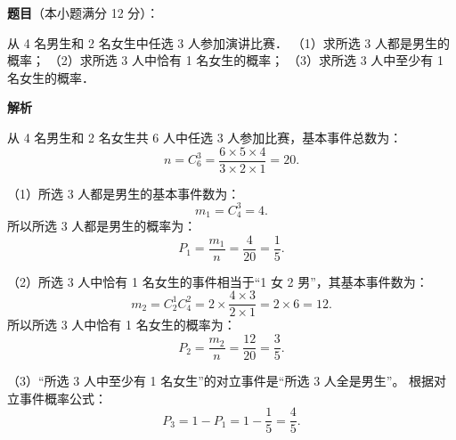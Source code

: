 \begin{answer}

\textbf{题目}（本小题满分 12 分）：

从 4 名男生和 2 名女生中任选 3 人参加演讲比赛．
（1）求所选 3 人都是男生的概率；
（2）求所选 3 人中恰有 1 名女生的概率；
（3）求所选 3 人中至少有 1 名女生的概率．

\textbf{解析}

从 4 名男生和 2 名女生共 6 人中任选 3 人参加比赛，基本事件总数为：
\nopagebreak[4]
\[
n = C_6^3 = \dfrac{6 \times 5 \times 4}{3 \times 2 \times 1} = 20.
\]

（1）所选 3 人都是男生的基本事件数为：
\nopagebreak[4]
\[
m_1 = C_4^3 = 4.
\]
所以所选 3 人都是男生的概率为：
\nopagebreak[4]
\[
P_1 = \dfrac{m_1}{n} = \dfrac{4}{20} = \dfrac{1}{5}.
\]

（2）所选 3 人中恰有 1 名女生的事件相当于“1 女 2 男”，其基本事件数为：
\nopagebreak[4]
\[
m_2 = C_2^1 C_4^2 = 2 \times \dfrac{4 \times 3}{2 \times 1} = 2 \times 6 = 12.
\]
所以所选 3 人中恰有 1 名女生的概率为：
\nopagebreak[4]
\[
P_2 = \dfrac{m_2}{n} = \dfrac{12}{20} = \dfrac{3}{5}.
\]

（3）“所选 3 人中至少有 1 名女生”的对立事件是“所选 3 人全是男生”。
根据对立事件概率公式：
\nopagebreak[4]
\[
P_3 = 1 - P_1 = 1 - \dfrac{1}{5} = \dfrac{4}{5}.
\]


\end{answer}
